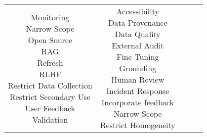 \documentclass[fleqn]{article}
\begin{document}
\begin{landscape}
\begin{table}[H]
\begin{tabular}{|c|c|c|c|c|}
{			\textbullet\hspace{3pt} Monitoring\\ 
			\textbullet\hspace{3pt} Narrow Scope\\ 
		 	\textbullet\hspace{3pt} Open Source\\ 		
			\textbullet\hspace{3pt} RAG\\ 	
			\textbullet\hspace{3pt} Refresh\\ 	
			\textbullet\hspace{3pt} RLHF\\ 	
			\textbullet\hspace{3pt} Restrict Data Collection\\ 				
			\textbullet\hspace{3pt} Restrict Secondary Use\\ 		
			\textbullet\hspace{3pt} User Feedback\\ 	
			\textbullet\hspace{3pt} Validation\\ 		
		}
		& \makecell[l]{
			\textbullet\hspace{3pt} Accessibility \\ 	
			\textbullet\hspace{3pt} Data Provenance\\ 	
			\textbullet\hspace{3pt} Data Quality\\ 	
			\textbullet\hspace{3pt} External Audit\\ 	
			\textbullet\hspace{3pt} Fine Tuning\\ 	
			\textbullet\hspace{3pt} Grounding\\ 	
			\textbullet\hspace{3pt} Human Review \\ 	
			\textbullet\hspace{3pt} Incident Response\\ 	
			\textbullet\hspace{3pt} Incorporate feedback \\ 	
		 	\textbullet\hspace{3pt} Narrow Scope\\  
			\textbullet\hspace{3pt} Restrict Homogeneity\\ 			 	
}
\end{tabular}
\end{table}
\end{landscape}
\end{document}
